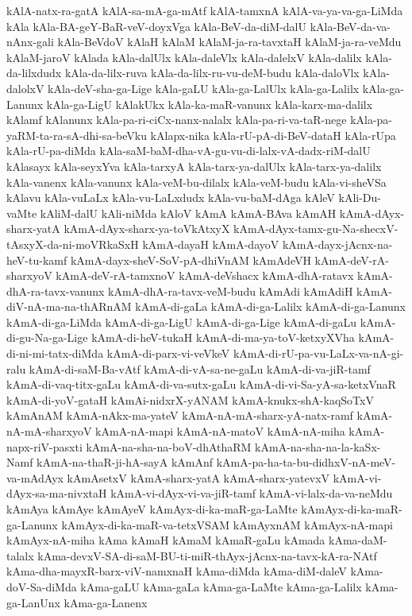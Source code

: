 {kAlA-natx-ra-gatA
kAlA-sa-mA-ga-mAtf
kAlA-tamxnA
kAlA-va-ya-va-ga-LiMda
kAla
kAla-BA-geY-BaR-veV-doyxVga
kAla-BeV-da-diM-dalU
kAla-BeV-da-va-nAnx-gali
kAla-BeVdoV
kAlaH
kAlaM
kAlaM-ja-ra-tavxtaH
kAlaM-ja-ra-veMdu
kAlaM-jaroV
kAlada
kAla-dalUlx
kAla-daleVlx
kAla-dalelxV
kAla-dalilx
kAla-da-lilxdudx
kAla-da-lilx-ruva
kAla-da-lilx-ru-vu-deM-budu
kAla-daloVlx
kAla-dalolxV
kAla-deV-sha-ga-Lige
kAla-gaLU
kAla-ga-LalUlx
kAla-ga-Lalilx
kAla-ga-Lanunx
kAla-ga-LigU
kAlakUkx
kAla-ka-maR-vanunx
kAla-karx-ma-dalilx
kAlamf
kAlanunx
kAla-pa-ri-ciCx-nanx-nalalx
kAla-pa-ri-va-taR-nege
kAla-pa-yaRM-ta-ra-sA-dhi-sa-beVku
kAlapx-nika
kAla-rU-pA-di-BeV-dataH
kAla-rUpa
kAla-rU-pa-diMda
kAla-saM-baM-dha-vA-gu-vu-di-lalx-vA-dadx-riM-dalU
kAlasayx
kAla-seyxYva
kAla-tarxyA
kAla-tarx-ya-dalUlx
kAla-tarx-ya-dalilx
kAla-vanenx
kAla-vanunx
kAla-veM-bu-dilalx
kAla-veM-budu
kAla-vi-sheVSa
kAlavu
kAla-vuLaLx
kAla-vu-LaLxdudx
kAla-vu-baM-dAga
kAleV
kAli-Du-vaMte
kAliM-dalU
kAli-niMda
kAloV
kAmA
kAmA-BAva
kAmAH
kAmA-dAyx-sharx-yatA
kAmA-dAyx-sharx-ya-toVkAtxyX
kAmA-dAyx-tamx-gu-Na-shecxV-tAsxyX-da-ni-moVRkaSxH
kAmA-dayaH
kAmA-dayoV
kAmA-dayx-jAcnx-na-heV-tu-kamf
kAmA-dayx-sheV-SoV-pA-dhiVnAM
kAmAdeVH
kAmA-deV-rA-sharxyoV
kAmA-deV-rA-tamxnoV
kAmA-deVshacx
kAmA-dhA-ratavx
kAmA-dhA-ra-tavx-vanunx
kAmA-dhA-ra-tavx-veM-budu
kAmAdi
kAmAdiH
kAmA-diV-nA-ma-na-thARnAM
kAmA-di-gaLa
kAmA-di-ga-Lalilx
kAmA-di-ga-Lanunx
kAmA-di-ga-LiMda
kAmA-di-ga-LigU
kAmA-di-ga-Lige
kAmA-di-gaLu
kAmA-di-gu-Na-ga-Lige
kAmA-di-heV-tukaH
kAmA-di-ma-ya-toV-ketxyXVha
kAmA-di-ni-mi-tatx-diMda
kAmA-di-parx-vi-veVkeV
kAmA-di-rU-pa-vu-LaLx-va-nA-gi-ralu
kAmA-di-saM-Ba-vAtf
kAmA-di-vA-sa-ne-gaLu
kAmA-di-va-jiR-tamf
kAmA-di-vaq-titx-gaLu
kAmA-di-va-sutx-gaLu
kAmA-di-vi-Sa-yA-sa-ketxVnaR
kAmA-di-yoV-gataH
kAmAi-nidxrX-yANAM
kAmA-knukx-shA-kaqSoTxV
kAmAnAM
kAmA-nAkx-ma-yateV
kAmA-nA-mA-sharx-yA-natx-ramf
kAmA-nA-mA-sharxyoV
kAmA-nA-mapi
kAmA-nA-matoV
kAmA-nA-miha
kAmA-napx-riV-pasxti
kAmA-na-sha-na-boV-dhAthaRM
kAmA-na-sha-na-la-kaSx-Namf
kAmA-na-thaR-ji-hA-sayA
kAmAnf
kAmA-pa-ha-ta-bu-didhxV-nA-meV-va-mAdAyx
kAmAsetxV
kAmA-sharx-yatA
kAmA-sharx-yatevxV
kAmA-vi-dAyx-sa-ma-nivxtaH
kAmA-vi-dAyx-vi-va-jiR-tamf
kAmA-vi-lalx-da-va-neMdu
kAmAya
kAmAye
kAmAyeV
kAmAyx-di-ka-maR-ga-LaMte
kAmAyx-di-ka-maR-ga-Lanunx
kAmAyx-di-ka-maR-va-tetxVSAM
kAmAyxnAM
kAmAyx-nA-mapi
kAmAyx-nA-miha
kAma
kAmaH
kAmaM
kAmaR-gaLu
kAmada
kAma-daM-talalx
kAma-devxV-SA-di-saM-BU-ti-miR-thAyx-jAcnx-na-tavx-kA-ra-NAtf
kAma-dha-mayxR-barx-viV-namxnaH
kAma-diMda
kAma-diM-daleV
kAma-doV-Sa-diMda
kAma-gaLU
kAma-gaLa
kAma-ga-LaMte
kAma-ga-Lalilx
kAma-ga-LanUnx
kAma-ga-Lanenx
}
